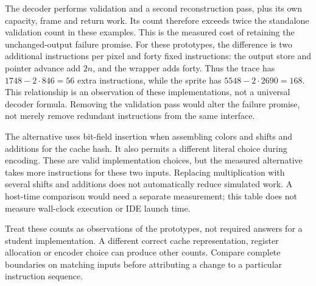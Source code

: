 The decoder performs validation and a second reconstruction pass, plus its own capacity,
frame and return work. Its count therefore exceeds twice the standalone validation
count in these examples. This is the measured cost of retaining the unchanged-output
failure promise. For these prototypes, the difference is two additional instructions
per pixel and forty fixed instructions: the output store and pointer advance add
\(2n\), and the wrapper adds forty. Thus the trace has \(1748-2\cdot846=56\) extra
instructions, while the sprite has \(5548-2\cdot2690=168\). This relationship is an
observation of these implementations, not a universal decoder formula. Removing the
validation pass would alter the failure promise, not merely remove redundant instructions
from the same interface.

The alternative uses bit-field insertion when assembling colors and shifts and additions
for the cache hash. It also permits a different literal choice during encoding. These
are valid implementation choices, but the measured alternative takes more instructions
for these two inputs. Replacing multiplication with several shifts and additions does
not automatically reduce simulated work. A host-time comparison would need a separate
measurement; this table does not measure wall-clock execution or IDE launch time.

Treat these counts as observations of the prototypes, not required answers for a
student implementation. A different correct cache representation, register allocation
or encoder choice can produce other counts. Compare complete boundaries on matching
inputs before attributing a change to a particular instruction sequence.
